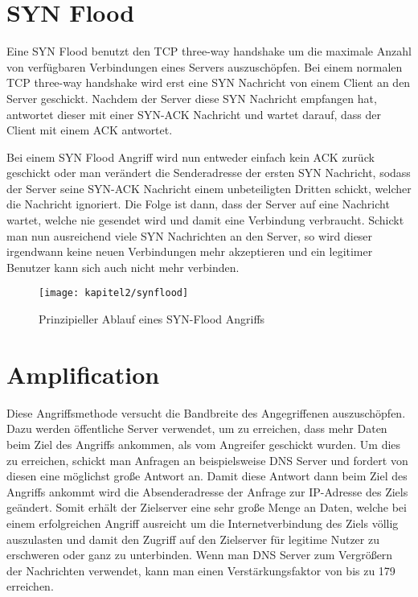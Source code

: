 \section{SYN Flood}

Eine SYN Flood benutzt den TCP three-way handshake um die maximale Anzahl von verfügbaren Verbindungen eines Servers auszuschöpfen. Bei einem normalen TCP three-way handshake wird erst eine SYN Nachricht von einem Client an den Server geschickt. Nachdem der Server diese SYN Nachricht empfangen hat, antwortet dieser mit einer SYN-ACK Nachricht und wartet darauf, dass der Client mit einem ACK antwortet.

Bei einem SYN Flood Angriff wird nun entweder einfach kein ACK zurück geschickt oder man verändert die Senderadresse der ersten SYN Nachricht, sodass der Server seine SYN-ACK Nachricht einem unbeteiligten Dritten schickt, welcher die Nachricht ignoriert. Die Folge ist dann, dass der Server auf eine Nachricht wartet, welche nie gesendet wird und damit eine Verbindung verbraucht. Schickt man nun ausreichend viele SYN Nachrichten an den Server, so wird dieser irgendwann keine neuen Verbindungen mehr akzeptieren und ein legitimer Benutzer kann sich auch nicht mehr verbinden.

\begin{figure}[H]
		\centering
		\texttt{[image: kapitel2/synflood]}
		\caption[SYN-Flooding]{Prinzipieller Ablauf eines SYN-Flood Angriffs}
		\label{img:synflood}
\end{figure}

\section{Amplification}

Diese Angriffsmethode versucht die Bandbreite des Angegriffenen auszuschöpfen. Dazu werden öffentliche Server verwendet, um zu erreichen, dass mehr Daten beim Ziel des Angriffs ankommen, als vom Angreifer geschickt wurden. Um dies zu erreichen, schickt man Anfragen an beispielsweise DNS Server und fordert von diesen eine möglichst große Antwort an. Damit diese Antwort dann beim Ziel des Angriffs ankommt wird die Absenderadresse der Anfrage zur IP-Adresse des Ziels geändert. Somit erhält der Zielserver eine sehr große Menge an Daten, welche bei einem erfolgreichen Angriff ausreicht um die Internetverbindung des Ziels völlig auszulasten und damit den Zugriff auf den Zielserver für legitime Nutzer zu erschweren oder ganz zu unterbinden. Wenn man DNS Server zum Vergrößern der Nachrichten verwendet, kann man einen Verstärkungsfaktor von bis zu 179 erreichen.

